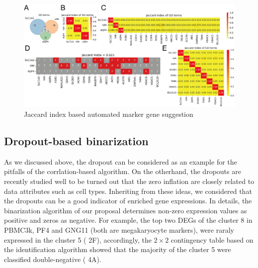 \documentclass{article}
\begin{document}
\begin{figure}[htb]
  \centering
  \includegraphics[scale=0.7]{./figs/exported/figure_3.png}
  \caption{Jaccard index based automated marker gene suggestion}
  \label{jibased}
\end{figure}


\subsection*{Dropout-based binarization}
As we discussed above, the dropout can be considered as an example for the pitfalls of the corrlation-based algorithm.
On the otherhand, the dropouts are recently studied well to be turned out that the zero inflation are closely related 
to data attributes such as cell types\cite{qiu2020embracing, zappia2017splatter}. Inheriting from these ideas, we considered that the dropouts can be 
a good indicator of enriched gene expressions. In details, the binarization algorithm of our proposal determines 
non-zero expression values as positive and zeros as negative. For example, the top two DEGs of the cluster 8 in 
PBMC3k, PF4 and GNG11 (both are megakaryocyte markers\cite{puhm2023diversity}), were raraly expressed in the cluster 5 (\figurename{ 2F}), 
accordingly, the $2\times 2$ contingency table based on the identification algorithm showed that the majority of the 
cluster 5 were classified double-negative (\figurename{ 4A}).
\end{document}
